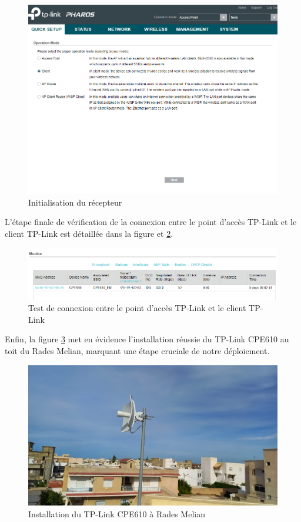 \begin{figure}[H]
\centering
\includegraphics[width=15cm]{Images/tplink36-2.png}
\caption{Initialisation du récepteur}
\label{Chap2.3.9}
\end{figure}

L'étape finale de vérification de la connexion entre le point d'accès TP-Link et le client TP-Link est détaillée dans la figure et \ref{Chap2.3.11}.


\begin{figure}[H]
\centering
\includegraphics[width=15cm]{Images/TPLink4.png}
\caption{Test de connexion entre le point d'accès TP-Link et le client TP-Link}
\label{Chap2.3.11}
\end{figure}

Enfin, la figure \ref{Chap2.3.12} met en évidence l'installation réussie du TP-Link CPE610 au toit du Rades Melian, marquant une étape cruciale de notre déploiement.

\begin{figure}[H]
\centering
\includegraphics[width=15cm]{Images/BRadesMelian-TPLinkCEP610-1.jpeg}
\caption{Installation du TP-Link CPE610 à Rades Melian}
\label{Chap2.3.12}
\end{figure}

